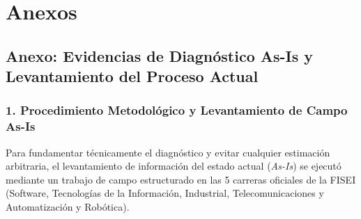 \documentclass[12pt,a4paper]{article}
\begin{document}
\vspace{0.4cm}

\section{Anexos}

\subsection*{Anexo: Evidencias de Diagnóstico As-Is y Levantamiento del Proceso Actual}

\subsubsection*{1. Procedimiento Metodológico y Levantamiento de Campo As-Is}
Para fundamentar técnicamente el diagnóstico y evitar cualquier estimación arbitraria, el levantamiento de información del estado actual (\textit{As-Is}) se ejecutó mediante un trabajo de campo estructurado en las 5 carreras oficiales de la FISEI (Software, Tecnologías de la Información, Industrial, Telecomunicaciones y Automatización y Robótica). 
\end{document}
